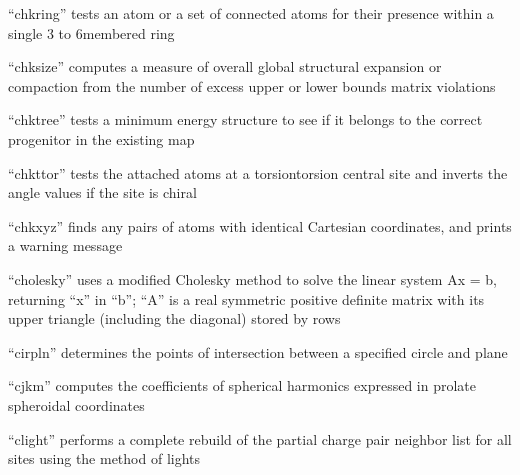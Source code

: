 \documentclass[letterpaper,11pt,english]{sphinxmanual}
\begin{document}

“chkring” tests an atom or a set of connected atoms for
their presence within a single 3\sphinxhyphen{} to 6\sphinxhyphen{}membered ring


“chksize” computes a measure of overall global structural
expansion or compaction from the number of excess upper
or lower bounds matrix violations



“chktree” tests a minimum energy structure to see if it
belongs to the correct progenitor in the existing map


“chkttor” tests the attached atoms at a torsion\sphinxhyphen{}torsion central
site and inverts the angle values if the site is chiral


“chkxyz” finds any pairs of atoms with identical Cartesian
coordinates, and prints a warning message


“cholesky” uses a modified Cholesky method to solve the linear
system Ax = b, returning “x” in “b”; “A” is a real symmetric
positive definite matrix with its upper triangle (including the
diagonal) stored by rows


“cirpln” determines the points of intersection between a
specified circle and plane


“cjkm” computes the coefficients of spherical harmonics
expressed in prolate spheroidal coordinates


“clight” performs a complete rebuild of the partial charge
pair neighbor list for all sites using the method of lights




\end{document}
